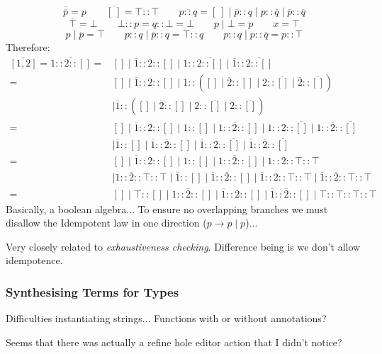 \[\overline{\overline{p}} = p \qquad \overline{[\ ]} = \top::\top \qquad \overline{p :: q} = [\ ] \mid \overline{p}::q \mid p::\overline{q} \mid \overline{p} :: \overline{q}\]
\[\overline{\top} = \bot \qquad \bot :: p = q :: \bot = \bot \qquad p \mid \bot = p \qquad x = \top\]
\[ p \mid \overline{p} = \top \qquad p :: q \mid \overline{p} :: q = \top ::q \qquad p :: q \mid p :: \overline{q} = p::\top\]
Therefore: 
{\tiny
\begin{align*}
\overline{[1,2]} = \overline{1::2::[]} = &[] \mid \overline{1} :: 2::[] \mid 1 :: \overline{2 :: []} \mid \overline{1} :: \overline{2::[]}\\
= &[] \mid \overline{1} :: 2::[] \mid 1 :: ([] \mid \overline{2} :: [] \mid 2 :: \overline{[]} \mid \overline{2} :: \overline{[]}) \\
&\mid \overline{1} :: ([] \mid \overline{2} :: [] \mid 2 :: \overline{[]} \mid \overline{2} :: \overline{[]})\\
= &[] \mid \overline{1} :: 2::[] \mid 1 :: [] \mid 1 :: \overline{2} :: [] \mid 1::2 :: \overline{[]} \mid 1::\overline{2} :: \overline{[]}\\
&\mid \overline{1} :: [] \mid \overline{1} ::\overline{2} :: [] \mid \overline{1} ::2 :: \overline{[]} \mid \overline{1} ::\overline{2} :: \overline{[]}\\
= &[] \mid \overline{1} :: 2::[] \mid 1 :: [] \mid 1 :: \overline{2} :: [] \mid 1::2 :: \top::\top\\
&\mid 1::\overline{2} :: \top::\top \mid \overline{1} :: [] \mid \overline{1} ::\overline{2} :: [] \mid \overline{1} ::2 :: \top::\top \mid \overline{1} ::\overline{2} :: \top :: \top\\
= &[] \mid \top::[] \mid 1::\overline{2}::[] \mid \overline{1}::2::[] \mid \overline{1}::\overline{2}::[] \mid \top::\top::\top::\top
\end{align*}
}
Basically, a boolean algebra... To ensure no overlapping branches we must disallow the Idempotent law in one direction ($p \to p \mid p$)...

Very closely related to \textit{exhaustiveness checking}. Difference being is we don't allow idempotence.

\subsubsection{Synthesising Terms for Types}
Difficulties instantiating strings...
Functions with or without annotations?

Seems that there was actually a refine hole editor action that I didn't notice?

